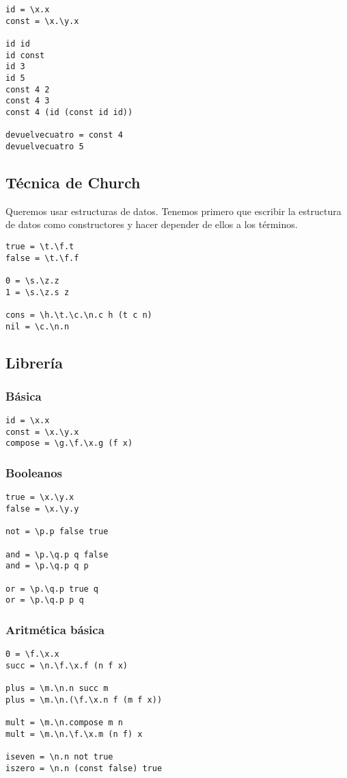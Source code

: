 \documentclass[11pt]{article}
\begin{document}
\begin{verbatim}
id = \x.x
const = \x.\y.x

id id
id const
id 3
id 5
const 4 2
const 4 3
const 4 (id (const id id))

devuelvecuatro = const 4
devuelvecuatro 5
\end{verbatim}

\subsection*{Técnica de Church}
\label{sec-14-4}
Queremos usar estructuras de datos. Tenemos primero que escribir
la estructura de datos como constructores y hacer depender de ellos
a los términos.

\begin{verbatim}
true = \t.\f.t
false = \t.\f.f

0 = \s.\z.z
1 = \s.\z.s z

cons = \h.\t.\c.\n.c h (t c n)
nil = \c.\n.n
\end{verbatim}

\subsection*{Librería}
\label{sec-14-5}
\subsubsection*{Básica}
\label{sec-14-5-1}
\begin{verbatim}
id = \x.x
const = \x.\y.x
compose = \g.\f.\x.g (f x)
\end{verbatim}

\subsubsection*{Booleanos}
\label{sec-14-5-2}
\begin{verbatim}
true = \x.\y.x
false = \x.\y.y

not = \p.p false true

and = \p.\q.p q false
and = \p.\q.p q p

or = \p.\q.p true q
or = \p.\q.p p q
\end{verbatim}

\subsubsection*{Aritmética básica}
\label{sec-14-5-3}
\begin{verbatim}
0 = \f.\x.x
succ = \n.\f.\x.f (n f x)

plus = \m.\n.n succ m
plus = \m.\n.(\f.\x.n f (m f x))

mult = \m.\n.compose m n
mult = \m.\n.\f.\x.m (n f) x

iseven = \n.n not true
iszero = \n.n (const false) true
\end{verbatim}
\end{document}
